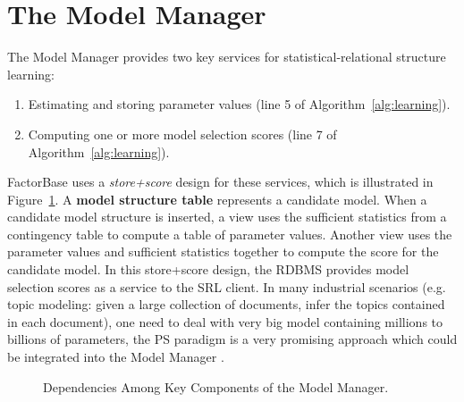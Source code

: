 \documentclass{sfuthesis}
\begin{document}
\section{The Model Manager}\label{sec:mod}
The Model Manager provides two key services for statistical-relational structure learning: 
\begin{enumerate}
\item Estimating and storing parameter values (line 5 of Algorithm~\ref{alg:learning}). 
\item Computing one or more model selection scores (line 7 of Algorithm~\ref{alg:learning}).
\end{enumerate}
 FactorBase  uses a {\em store+score} design for these services, which is illustrated in Figure~\ref{fig:learning}. 
A \textbf{model structure table} represents a candidate model. When a candidate model structure is inserted, a view uses the sufficient statistics from a contingency table to compute a table of parameter values. Another view uses the parameter values and sufficient statistics together to compute the score for the candidate model. In this store+score design, the RDBMS provides model selection scores as a service to the SRL client. 
In many industrial scenarios (e.g. topic modeling: given a large collection of documents, infer the topics contained in each document), one need to deal with very big model containing millions to billions of parameters, the PS paradigm is a very promising approach which could be integrated into the Model Manager \cite{Li2014}.


\begin{figure}[htbp]
\begin{center}
\caption{Dependencies Among Key Components of the Model  Manager. 
\label{fig:learning}}
\end{center}
\end{figure}
\end{document}
